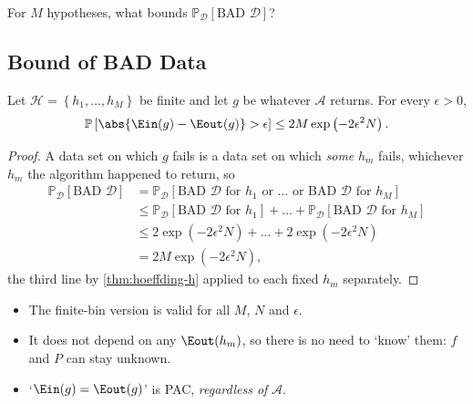 \begin{question}
    For \(M\) hypotheses, what bounds
    \(\mathbb{P}_{\mathcal{D}}\left[ \text{BAD } \mathcal{D} \right]\)?
\end{question}

\subsection{Bound of BAD Data}

\begin{theorem}\label{thm:finite-hoeffding}
    Let \(\mathcal{H} = \left\{ h_1, \dots , h_M \right\}\) be finite and let
    \(g\) be whatever \(\mathcal{A}\) returns. For every \(\epsilon > 0\),
    \[
        \mathbb{P}\left[ \abs{\Ein(g) - \Eout(g)} > \epsilon \right]
        \le 2M \exp \left( -2 \epsilon^2 N \right) .
    \]
\end{theorem}

\begin{proof}
    A data set on which \(g\) fails is a data set on which \emph{some} \(h_m\)
    fails, whichever \(h_m\) the algorithm happened to return, so
    \begin{align*}
        \mathbb{P}_{\mathcal{D}}\left[ \text{BAD } \mathcal{D} \right]
        &= \mathbb{P}_{\mathcal{D}}\left[ \text{BAD } \mathcal{D} \text{ for } h_1
        \text{ or } \dots \text{ or BAD } \mathcal{D} \text{ for } h_M \right]\\
        &\le \mathbb{P}_{\mathcal{D}}\left[ \text{BAD } \mathcal{D} \text{ for } h_1 \right]
        + \dots
        + \mathbb{P}_{\mathcal{D}}\left[ \text{BAD } \mathcal{D} \text{ for } h_M \right]
        \tag{union bound}\\
        &\le 2 \exp \left( -2 \epsilon^2 N \right) + \dots
        + 2 \exp \left( -2 \epsilon^2 N \right)\\
        &= 2M \exp \left( -2 \epsilon^2 N \right) ,
    \end{align*}
    the third line by \autoref{thm:hoeffding-h} applied to each fixed \(h_m\)
    separately.
\end{proof}

\begin{itemize}
    \item The finite-bin version is valid for all \(M\), \(N\) and \(\epsilon\).
    \item It does not depend on any \(\Eout(h_m)\), so there is no need to
        `know' them: \(f\) and \(P\) can stay unknown.
    \item `\(\Ein(g) = \Eout(g)\)' is PAC, \emph{regardless of} \(\mathcal{A}\).
\end{itemize}

